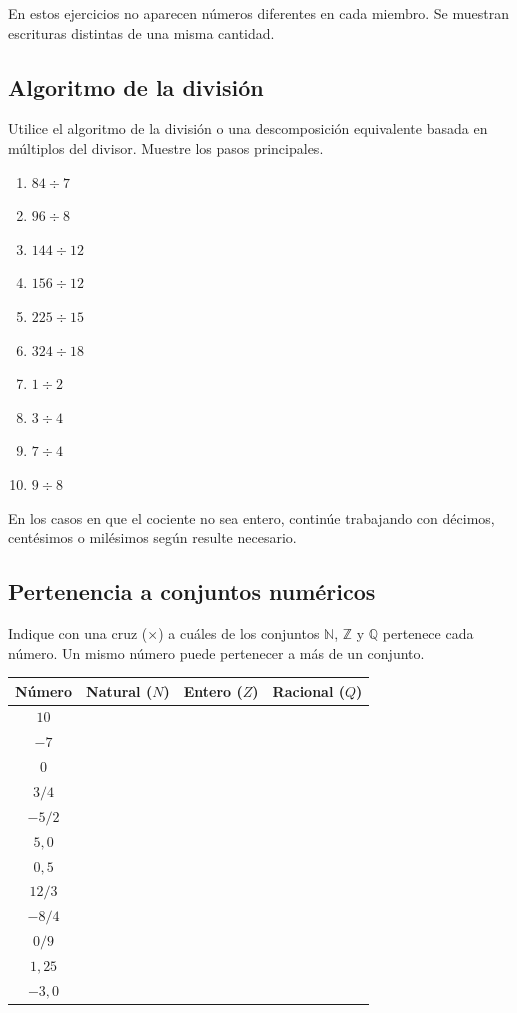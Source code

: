 En estos ejercicios no aparecen números diferentes en cada miembro. Se muestran escrituras distintas de una misma cantidad.

\subsection*{Algoritmo de la división}

Utilice el algoritmo de la división o una descomposición equivalente basada en múltiplos del divisor. Muestre los pasos principales.

\begin{enumerate}
\item \(84\div7\)
\item \(96\div8\)
\item \(144\div12\)
\item \(156\div12\)
\item \(225\div15\)
\item \(324\div18\)
\item \(1\div2\)
\item \(3\div4\)
\item \(7\div4\)
\item \(9\div8\)
\end{enumerate}

En los casos en que el cociente no sea entero, continúe trabajando con décimos, centésimos o milésimos según resulte necesario.

\subsection*{Pertenencia a conjuntos numéricos}

Indique con una cruz (\(\times\)) a cuáles de los conjuntos \(\mathbb N\), \(\mathbb Z\) y \(\mathbb Q\) pertenece cada número. Un mismo número puede pertenecer a más de un conjunto.

\begin{center}
\begin{tabular}{c|c|c|c}
Número & Natural (\({N}\)) & Entero (\(Z\)) & Racional (\(Q\)) \\ \hline
\(10\) & & & \\ \hline
\(-7\) & & & \\ \hline
\(0\) & & & \\ \hline
\(3/4\) & & & \\ \hline
\(-5/2\) & & & \\ \hline
\(5{,}0\) & & & \\ \hline
\(0{,}5\) & & & \\ \hline
\(12/3\) & & & \\ \hline
\(-8/4\) & & & \\ \hline
\(0/9\) & & & \\ \hline
\(1{,}25\) & & & \\ \hline
\(-3{,}0\) & & &  
\end{tabular}
\end{center}

